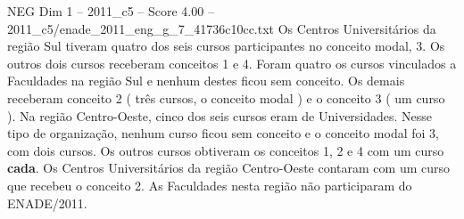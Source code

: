 \begin{textsample}{NEG Dim 1 – 2011\_c5 – Score 4.00 – 2011\_c5/enade\_2011\_eng\_g\_7\_41736c10cc.txt}
Os Centros Universitários da região Sul tiveram quatro dos seis cursos participantes no conceito modal, 3.
Os outros dois cursos receberam conceitos 1 e 4.
Foram quatro os cursos vinculados a Faculdades na região Sul e nenhum destes ficou sem conceito.
Os demais receberam conceito 2 ( três cursos, o conceito modal ) e o conceito 3 ( um curso ).
Na região Centro-Oeste, cinco dos seis cursos eram de Universidades.
Nesse tipo de organização, nenhum curso ficou sem conceito e o conceito modal foi 3, com dois cursos.
Os outros cursos obtiveram os conceitos 1, 2 e 4 com um curso \textbf{cada}.
Os Centros Universitários da região Centro-Oeste contaram com um curso que recebeu o conceito 2.
As Faculdades nesta região não participaram do ENADE/2011.

\end{textsample}
